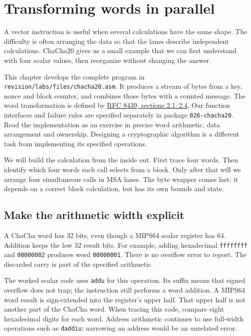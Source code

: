 \chapter{Transforming words in parallel}
\label{revision:chacha}

A vector instruction is useful when several calculations have the same shape.
The difficulty is often arranging the data so that the lanes describe independent
calculations. ChaCha20 gives us a small example that we can first understand
with four scalar values, then reorganize without changing the answer.

This chapter develops the complete program in
\texttt{revision/labs/files/chacha20.asm}. It produces a stream of bytes from a
key, nonce and block counter, and combines those bytes with a counted message.
The word transformation is defined by
\href{https://www.rfc-editor.org/rfc/rfc8439.html}{RFC 8439, sections 2.1--2.4}.
Our function interfaces and failure rules are specified separately in package
\texttt{026-chacha20}. Read the implementation as an exercise in precise word
arithmetic, data arrangement and ownership. Designing a cryptographic algorithm
is a different task from implementing its specified operations.

We will build the calculation from the inside out. First trace four words. Then
identify which four words each call selects from a block. Only after that will
we arrange four simultaneous calls in MSA lanes. The byte wrapper comes last:
it depends on a correct block calculation, but has its own bounds and state.

\section{Make the arithmetic width explicit}

A ChaCha word has 32 bits, even though a MIPS64 scalar register has 64. Addition
keeps the low 32 result bits. For example, adding hexadecimal
\texttt{ffffffff} and \texttt{00000002} produces word \texttt{00000001}.
There is no overflow error to report. The discarded carry is part of the
specified arithmetic.

The worked scalar code uses \texttt{addu} for this operation. Its suffix means
that signed overflow does not trap; the instruction still performs a word
addition. A MIPS64 word result is sign-extended into the register's upper half.
That upper half is not another part of the ChaCha word. When tracing this code,
compare eight hexadecimal digits for each word. Address arithmetic continues to
use full-width operations such as \texttt{daddiu}; narrowing an address would
be an unrelated error.

